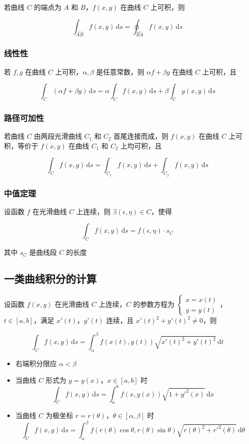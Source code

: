 \documentclass[lang = zh , final , oneside , openany , titlepage , zihao = -4 , linespread = 1.3 , baselineskip = false , cjk-font = windows , text-font = newtx , math-font = newtx]{sjtureport}
\begin{document}
若曲线 \(C\) 的端点为 \(A\) 和 \(B\)，\(f(x,y)\) 在曲线 \(C\) 上可积，则

\[\int_{\widehat{AB}} f(x,y)\,\mathrm{d}s=\oint_{\widehat{BA}} f(x,y)\,\mathrm{d}s\]

\subsubsection{线性性}

若 \(f,g\) 在曲线 \(C\) 上可积，\(\alpha , \beta\) 是任意常数，则
\(\alpha f + \beta g\) 在曲线 \(C\) 上可积，且

\[\int_C (\alpha f + \beta g)\,\mathrm{d}s = \alpha \int_C f(x,y)\,\mathrm{d}s + \beta \int_C g(x,y)\,\mathrm{d}s\]

\subsubsection{路径可加性}

若曲线 \(C\) 由两段光滑曲线 \(C_1\) 和 \(C_2\) 首尾连接而成，则
\(f(x,y)\) 在曲线 \(C\) 上可积，等价于 \(f(x,y)\) 在曲线 \(C_1\) 和
\(C_2\) 上均可积，且

\[\int_C f(x,y)\,\mathrm{d}s = \int_{C_1} f(x,y)\,\mathrm{d}s + \int_{C_2} f(x,y)\,\mathrm{d}s\]

\subsubsection{中值定理}

设函数 \(f\) 在光滑曲线 \(C\) 上连续，则
\(\exists (\epsilon,\eta)\in C\)，使得

\[\int_C f(x,y)\,\mathrm{d}s = f(\epsilon,\eta)\cdot s_C\]

其中 \(s_C\) 是曲线段 \(C\) 的长度

\subsection{一类曲线积分的计算}

设函数 \(f(x,y)\) 在光滑曲线 \(C\) 上连续，\(C\) 的参数方程为
\(\begin{cases}x=x(t)\\y=y(t)\end{cases}\)，\(t\in [a,b]\)，满足
\(x'(t)\)，\(y'(t)\) 连续，且 \(x'(t)^2 + y'(t)^2 \neq 0\)，则

\[\int_C f(x,y)\,\mathrm{d}s = \int_\alpha^\beta f(x(t),y(t))\sqrt{x'(t)^2 + y'(t)^2}\,\mathrm{d}t\]

\begin{itemize}
\item
  右端积分限应 \(\alpha < \beta\)
\item
  当曲线 \(C\) 形式为 \(y=y(x)\)，\(x\in [a,b]\) 时
  \[\displaystyle\int_Cf(x,y)\,\mathrm{d}s =\int_a^bf(x,y(x))\sqrt{1+y'^2(x)}\,\mathrm{d}x\]
\item
  当曲线 \(C\) 为极坐标 \(r=r(\theta)\)，\(\theta\in [\alpha,\beta]\)
  时
  \[\displaystyle\int_Cf(x,y)\,\mathrm{d}s = \int_\alpha^\beta f(r(\theta)\cos\theta,r(\theta)\sin\theta)\sqrt{r(\theta)^2+r'^2(\theta)}\,\mathrm{d}\theta\]
\end{itemize}
\end{document}
